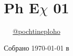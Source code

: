 \title{\huge \textbf{Ph E\(\chi\) 01}}
\author{
  \href{https://t.me/pochtineploho}{@pochtineploho}
}
\date{Собрано {\ddmmyyyydate\today} в \currenttime}
\newcommand{\githublink}{https://github.com/isagila/tesc}

